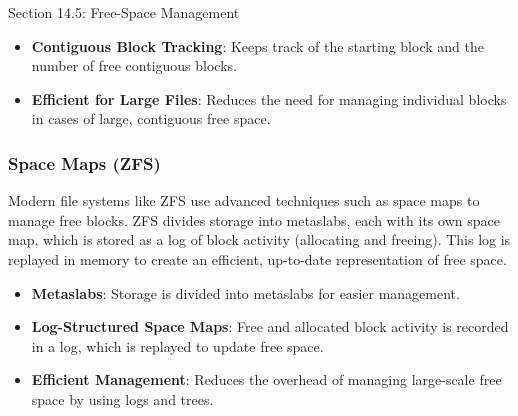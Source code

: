 \begin{notes}{Section 14.5: Free-Space Management}
    \begin{highlight}[Counting]
    
        \begin{itemize}
            \item \textbf{Contiguous Block Tracking}: Keeps track of the starting block and the number of free contiguous blocks.
            \item \textbf{Efficient for Large Files}: Reduces the need for managing individual blocks in cases of large, contiguous free space.
        \end{itemize}
    
    \end{highlight}
    
    \subsubsection*{Space Maps (ZFS)}
    
    Modern file systems like ZFS use advanced techniques such as space maps to manage free blocks. ZFS divides storage into metaslabs, each with its own space map, which is stored as a log of block activity 
    (allocating and freeing). This log is replayed in memory to create an efficient, up-to-date representation of free space.
    
    \begin{highlight}
    
        \begin{itemize}
            \item \textbf{Metaslabs}: Storage is divided into metaslabs for easier management.
            \item \textbf{Log-Structured Space Maps}: Free and allocated block activity is recorded in a log, which is replayed to update free space.
            \item \textbf{Efficient Management}: Reduces the overhead of managing large-scale free space by using logs and trees.
        \end{itemize}
    
    \end{highlight}
    
    \begin{highlight}
    

\end{highlight}
\end{notes}
